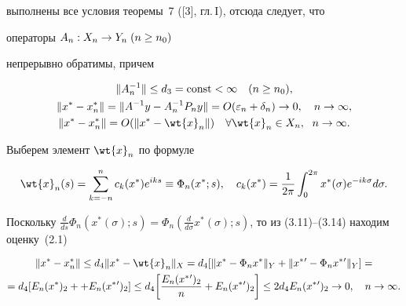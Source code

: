 выполнены все условия теоремы~7 ([3], гл.\,I), отсюда следует, что


операторы $A_n : X_n \to Y_n\; (n\geq n_0)$


непрерывно обратимы, причем


\begin{gather}


\|A_n^{-1}\|\leq d_3=\const<\infty \quad (n\geq n_0), \\


%


\|x^*-x_n^*\|=\|A^{-1}y-A_n^{-1}P_ny\|= O (\varepsilon_n+


\delta_n)\rightarrow 0,\quad n\rightarrow \infty , \\


%


\|x^*-x_n^*\|= O (\|x^*-\wt{x}_n\|)\quad


\forall \wt{x}_n\in X_n,\ \; n\rightarrow \infty .


\end{gather}


Выберем элемент $\wt{x}_n$ по формуле


\begin{equation}


\wt{x}_n(s)=\sum_{k=-n}^nc_k(x^*) e^{iks}\equiv \Phi_n(x^*;s),


\quad c_k(x^*)=\frac{1}{2\pi}\int_0^{2\pi}x^*(\sigma)


e^{-ik\sigma}d\sigma .


\end{equation}


Поскольку $\frac{d}{ds}\Phi_n(x^*(\sigma);s)=\Phi_n\left( \frac{d}{d\sigma}


x^*(\sigma);s\right)$, то из (3.11)--(3.14) находим оценку~(2.1)


\begin{multline*}


\|x^*-x_n^*\|\leq d_4 \|x^*-\wt{x}_n\|_X = 


d_4[\|x^*-\Phi_nx^*\|_Y +\|x^*{}'-\Phi_nx^*{}'\|_Y] = \\


%


=d_4 [ E_n(x^*)_2 ++E_n(x^*{}')_2] \leq


d_4 \bigg[\frac{E_n(x^*{}')_2}{n}+E_n(x^*{}')_2\bigg] \leq2


d_4E_n(x^*{}')_2 \rightarrow 0,\quad n\rightarrow\infty .


\end{multline*}





